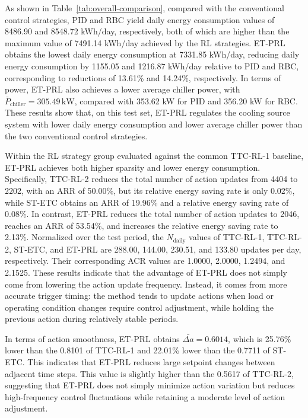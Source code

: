 \documentclass[preprint,12pt,number]{elsarticle}
\begin{document}
As shown in Table~\ref{tab:overall-comparison}, compared with the conventional control strategies, PID and RBC yield daily energy consumption values of 8486.90 and 8548.72 kWh/day, respectively, both of which are higher than the maximum value of 7491.14 kWh/day achieved by the RL strategies. ET-PRL obtains the lowest daily energy consumption at 7331.85 kWh/day, reducing daily energy consumption by 1155.05 and 1216.87 kWh/day relative to PID and RBC, corresponding to reductions of 13.61\% and 14.24\%, respectively. In terms of power, ET-PRL also achieves a lower average chiller power, with \(\bar{P}_{\text{chiller}}=305.49\,\mathrm{kW}\), compared with 353.62 kW for PID and 356.20 kW for RBC. These results show that, on this test set, ET-PRL regulates the cooling source system with lower daily energy consumption and lower average chiller power than the two conventional control strategies.

Within the RL strategy group evaluated against the common TTC-RL-1 baseline, ET-PRL achieves both higher sparsity and lower energy consumption. Specifically, TTC-RL-2 reduces the total number of action updates from 4404 to 2202, with an ARR of 50.00\%, but its relative energy saving rate is only 0.02\%, while ST-ETC obtains an ARR of 19.96\% and a relative energy saving rate of 0.08\%. In contrast, ET-PRL reduces the total number of action updates to 2046, reaches an ARR of 53.54\%, and increases the relative energy saving rate to 2.13\%. Normalized over the test period, the \(N_{\text{daily}}\) values of TTC-RL-1, TTC-RL-2, ST-ETC, and ET-PRL are 288.00, 144.00, 230.51, and 133.80 updates per day, respectively. Their corresponding ACR values are 1.0000, 2.0000, 1.2494, and 2.1525. These results indicate that the advantage of ET-PRL does not simply come from lowering the action update frequency. Instead, it comes from more accurate trigger timing: the method tends to update actions when load or operating condition changes require control adjustment, while holding the previous action during relatively stable periods.

In terms of action smoothness, ET-PRL obtains \(\bar{\Delta a}=0.6014\), which is 25.76\% lower than the 0.8101 of TTC-RL-1 and 22.01\% lower than the 0.7711 of ST-ETC. This indicates that ET-PRL reduces large setpoint changes between adjacent time steps. This value is slightly higher than the 0.5617 of TTC-RL-2, suggesting that ET-PRL does not simply minimize action variation but reduces high-frequency control fluctuations while retaining a moderate level of action adjustment.
\end{document}
